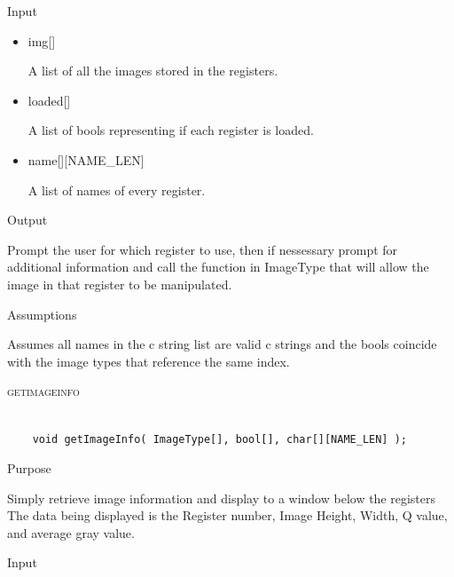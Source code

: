 \documentclass[pdftex, 11pt]{article}
\begin{document}
\begin{description}
\begin{description}
			\item{Input}

				\begin{itemize}

					\item{img[]}

						A list of all the images stored in the registers.

					\item{loaded[]}

						A list of bools representing if each register is loaded.

					\item{name[][NAME\_LEN]}

						A list of names of every register.

				\end{itemize}

			\item{Output}

				Prompt the user for which register to use, then if nessessary
				prompt for additional information and call the function
				in ImageType that will allow the image in that register to
				be manipulated.

			\item{Assumptions}

				Assumes all names in the c string list are valid c
				strings and the bools coincide with the image types that
				reference the same index.

		\end{description}



	\item{\textsc{getimageinfo}}

		\begin{lstlisting}

	void getImageInfo( ImageType[], bool[], char[][NAME_LEN] );
		\end{lstlisting}

		\begin{description}
			\item{Purpose}

				Simply retrieve image information and display to a window below the registers
				The data being displayed is the Register number, Image Height, Width, Q value,
				and average gray value.

			\item{Input}

				\begin{itemize}


\end{itemize}
\end{description}
\end{description}
\end{document}
